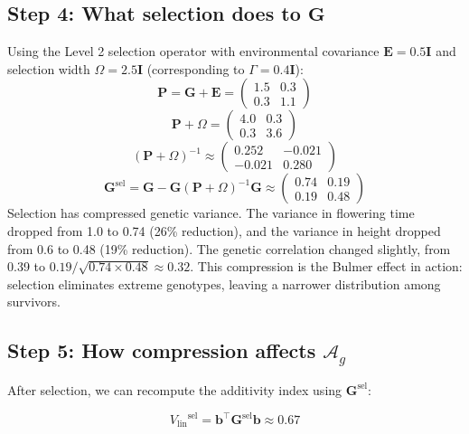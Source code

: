 \documentclass[9pt,twocolumn,twoside,lineno]{gsajnl}
\newcommand{\vect}[1]{\boldsymbol{#1}}
\newcommand{\mat}[1]{\mathbf{#1}}
\newcommand{\Ag}{\ensuremath{\mathcal{A}_{g}}\xspace}
\newcommand{\Gsel}{\ensuremath{\mat{G}^{\text{sel}}}\xspace}
\newcommand{\Vlin}{\ensuremath{V_{\text{lin}}}\xspace}
\begin{document}
\subsection{Step 4: What selection does to $\mat{G}$}
Using the Level 2 selection operator with environmental covariance $\mat{E} = 0.5\mat{I}$ and selection width $\Omega = 2.5\mat{I}$ (corresponding to $\Gamma = 0.4\mat{I}$):
\begin{equation}
\mat{P} = \mat{G} + \mat{E} = \begin{pmatrix} 1.5 & 0.3 \\ 0.3 & 1.1 \end{pmatrix}
\end{equation}
\begin{equation}
\mat{P} + \Omega = \begin{pmatrix} 4.0 & 0.3 \\ 0.3 & 3.6 \end{pmatrix}
\end{equation}
\begin{equation}
(\mat{P} + \Omega)^{-1} \approx \begin{pmatrix} 0.252 & -0.021 \\ -0.021 & 0.280 \end{pmatrix}
\end{equation}
\begin{equation}
\Gsel = \mat{G} - \mat{G}(\mat{P}+\Omega)^{-1}\mat{G} \approx \begin{pmatrix} 0.74 & 0.19 \\ 0.19 & 0.48 \end{pmatrix}
\end{equation}
Selection has compressed genetic variance. The variance in flowering time dropped from 1.0 to 0.74 (26\% reduction), and the variance in height dropped from 0.6 to 0.48 (19\% reduction). The genetic correlation changed slightly, from 0.39 to $0.19/\sqrt{0.74 \times 0.48} \approx 0.32$. This compression is the Bulmer effect in action: selection eliminates extreme genotypes, leaving a narrower distribution among survivors.

\subsection{Step 5: How compression affects \Ag}

After selection, we can recompute the additivity index using $\Gsel$:

\begin{equation}
\Vlin^{\text{sel}} = \vect{b}^\top \Gsel \vect{b} \approx 0.67
\end{equation}
\end{document}

